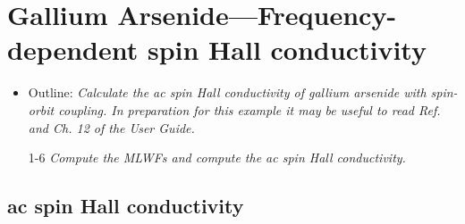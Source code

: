 \section{Gallium Arsenide---Frequency-dependent spin Hall conductivity}
\label{sec30:GaAsSHC}

\begin{itemize}
	\item Outline: {\it Calculate the ac spin Hall conductivity
	of gallium arsenide with spin-orbit coupling. In preparation for this example it may be useful to read Ref.~ and Ch. 12 of the User Guide.}
\end{itemize}

\begin{itemize}
	\item[1-6] {\it Compute the MLWFs and compute the ac spin Hall conductivity.} 
\end{itemize}

\subsection*{ac spin Hall conductivity}

